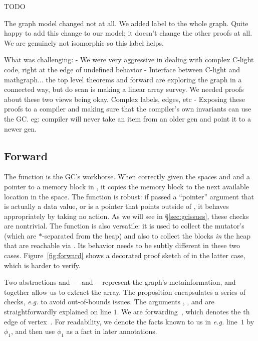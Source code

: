 \hide
{\color{red} TODO

The graph model changed not at all. We added label to the whole graph. Quite happy to add this change to our model; it doesn't change the other proofs at all. We are genuinely not isomorphic so this label helps.

What was challenging:
	- We were very aggressive in dealing with complex C-light code, right at the edge of undefined behavior
	- Interface between C-light and mathgraph... the top level theorems and forward are exploring the graph in a connected way, but do scan is making a linear array survey. We needed proofs about these two views being okay. Complex labels, edges, etc
	- Exposing these proofs to a compiler and making sure that the compiler's own invariants can use the GC. eg: compiler will never take an item from an older gen and point it to a newer gen.
}

\subsection{Forward}
\label{sec:gcforward}

The function  is the GC's workhorse.
When correctly given the spaces  and  and a pointer
 to a memory block in ,
it copies the memory block to the next
available location in the  space.
The function is robust: if passed a ``pointer'' argument
that is actually a data value, or is a pointer that points outside of
, it behaves appropriately by taking no action.
As we will see in \S\ref{sec:gcissues}, these checks are nontrivial.
The function is also versatile: it is used to collect the
mutator's  (which are $*$-separated from the heap)
and also to collect the blocks \emph{in} the heap that are reachable via
. Its behavior needs to be subtly different in these
two cases.
Figure~\ref{fig:forward} shows a decorated proof sketch of 
in the latter case, which is harder to verify.

Two abstractions  
and --- and ---represent the 
graph's metainformation, and together allow us to
extract the  array. The
proposition  encapsulates a series of checks, 
\emph{e.g.} to avoid out-of-bounds issues.
The arguments , , and  are straightforwardly
explained on line $1$. 
We are forwarding~, 
which denotes the th edge of vertex~. 
For readability,
we denote the facts known to us in
\emph{e.g.} line~$1$ by $\phi_1$, and then use $\phi_1$
as a fact in later annotations.

